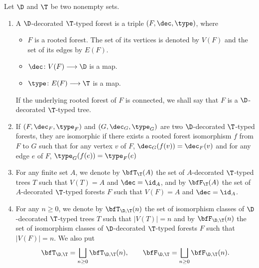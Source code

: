 \begin{Definition}
Let $\D$ and $\T$ be two nonempty sets.
\begin{enumerate}\itemsep=0pt
\item A $\D$-decorated $\T$-typed forest is a triple $(F,\dec,\type)$, where
\begin{itemize}\itemsep=0pt
\item $F$ is a rooted forest. The set of its vertices is denoted by $V(F)$ and the set of its edges by $E(F)$.
\item $\dec\colon V(F)\longrightarrow \D$ is a map.
\item $\type\colon E(F)\longrightarrow \T$ is a map.
\end{itemize}
If the underlying rooted forest of $F$ is connected, we shall say that $F$ is a $\D$-decorated $\T$-typed tree.
\item If $(F,\dec_F,\type_F)$ and $(G,\dec_G,\type_G)$ are two $\D$-decorated $\T$-typed forests,
they are isomorphic if there exists a rooted forest isomorphism $f$ from $F$ to $G$ such that for any vertex $v$ of $F$,
$\dec_G(f(v))=\dec_F(v)$ and for any edge $e$ of $F$, $\type_G(f(e))=\type_F(e)$
\item For any finite set $A$, we denote by $\bfT_\T(A)$ the set of $A$-decorated
$\T$-typed trees $T$ such that $V(T)=A$
and $\dec=\id_A$, and by $\bfF_\T(A)$ the set of $A$-decorated $\T$-typed forests $F$ such that $V(F)=A$ and $\dec=\id_A$.
\item For any $n\geq 0$, we denote by $\bfT_{\D,\T}(n)$ the set of isomorphism classes of $\D$-decorated $\T$-typed trees $T$
such that $|V(T)|=n$ and by $\bfF_{\D,\T}(n)$ the set of isomorphism classes of $\D$-decorated $\T$-typed forests $F$
such that $|V(F)|=n$.
We also put
\begin{gather*}
\bfT_{\D,\T}=\bigsqcup_{n\geq 0} \bfT_{\D,\T}(n),\qquad
\bfF_{\D,\T}=\bigsqcup_{n\geq 0} \bfF_{\D,\T}(n).
\end{gather*}
\end{enumerate}
\end{Definition}

